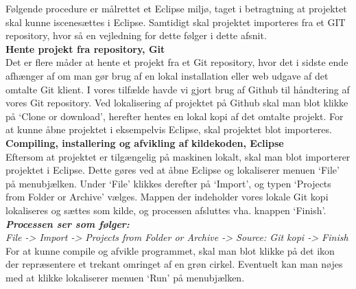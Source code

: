 Følgende procedure er målrettet et Eclipse miljø, taget i betragtning at projektet skal kunne iscenesættes i Eclipse. Samtidigt skal projektet importeres fra et GIT repository, hvor så en vejledning for dette følger i dette afsnit.\\

\noindent \textbf{Hente projekt fra repository, Git}\\
Det er flere måder at hente et projekt fra et Git repository, hvor det i sidste ende afhænger af om man gør brug af en lokal installation eller web udgave af det omtalte Git klient. I vores tilfælde havde vi gjort brug af Github til håndtering af vores Git repository. Ved lokalisering af projektet på Github skal man blot klikke på ‘Clone or download’, herefter hentes en lokal kopi af det omtalte projekt. For at kunne åbne projektet i eksempelvis Eclipse, skal projektet blot importeres.\\

\noindent \textbf{Compiling, installering og afvikling af kildekoden, Eclipse}\\
Eftersom at projektet er tilgængelig på maskinen lokalt, skal man blot importerer projektet i Eclipse. Dette gøres ved at åbne Eclipse og lokaliserer menuen ‘File’ på menubjælken. Under ‘File’ klikkes derefter på ‘Import’, og typen ‘Projects from Folder or Archive’ vælges. Mappen der indeholder vores lokale Git kopi lokaliseres og sættes som kilde, og processen afsluttes vha. knappen ‘Finish’.\\

\noindent \textbf{\textit{Processen ser som følger:}}\\
\textit{File -> Import -> Projects from Folder or Archive -> Source: Git kopi -> Finish}\\

\noindent For at kunne compile og afvikle programmet, skal man blot klikke på det ikon der repræsentere et trekant omringet af en grøn cirkel. Eventuelt kan man nøjes med at klikke lokaliserer menuen ‘Run’ på menubjælken.
